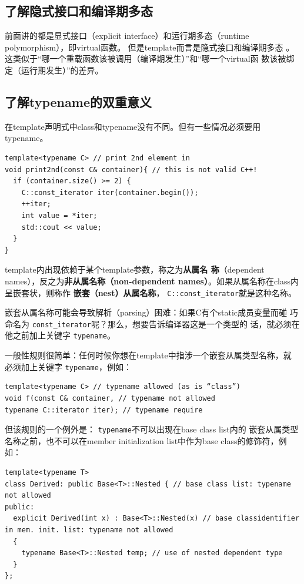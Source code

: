 \documentclass[a4paper,twoside]{article}
\theoremstyle{definition}
\theoremstyle{remark}
\numberwithin{equation}{section}
\let\OldTexttt\texttt
\renewcommand{\texttt}[1]{{\color{blue} \OldTexttt{#1}}}
\begin{document}
\subsection{了解隐式接口和编译期多态}
\label{sec:Item-41}

前面讲的都是显式接口（explicit interface）和运行期多态（runtime
polymorphism），即virtual函数。 但是template而言是隐式接口和编译期多态
。这类似于“哪一个重载函数该被调用（编译期发生）”和“哪一个virtual函
数该被绑定（运行期发生）”的差异。

\subsection{了解typename的双重意义}
\label{sec:Item-42}

在template声明式中class和typename没有不同。但有一些情况必须要用
typename。

\begin{verbatim}
template<typename C> // print 2nd element in
void print2nd(const C& container){ // this is not valid C++!
  if (container.size() >= 2) {
    C::const_iterator iter(container.begin());
    ++iter;
    int value = *iter;
    std::cout << value;
  }
}
\end{verbatim}

template内出现依赖于某个template参数，称之为\textbf{从属名
  称}（dependent names），反之为\textbf{非从属名称（non-dependent
  names）}。如果从属名称在class内呈嵌套状，则称作
\textbf{嵌套（nest）从属名称}，\texttt{C::const\_iterator}就是这种名称。

嵌套从属名称可能会导致解析（parsing）困难：如果C有个static成员变量而碰
巧命名为\texttt{const\_iterator}呢？那么，想要告诉编译器这是一个类型的
话，就必须在他之前加上关键字\texttt{typename}。

一般性规则很简单：任何时候你想在template中指涉一个嵌套从属类型名称，就
必须加上关键字\texttt{typename}，例如：
\begin{verbatim}
template<typename C> // typename allowed (as is “class”)
void f(const C& container, // typename not allowed
typename C::iterator iter); // typename require
\end{verbatim}

但该规则的一个例外是：\texttt{typename}不可以出现在base class list内的
嵌套从属类型名称之前，也不可以在member initialization list中作为base
class的修饰符，例如：
\begin{verbatim}
template<typename T>
class Derived: public Base<T>::Nested { // base class list: typename not allowed
public: 
  explicit Derived(int x) : Base<T>::Nested(x) // base classidentifier in mem. init. list: typename not allowed
  {
    typename Base<T>::Nested temp; // use of nested dependent type
  }
};
\end{verbatim}
\end{document}
